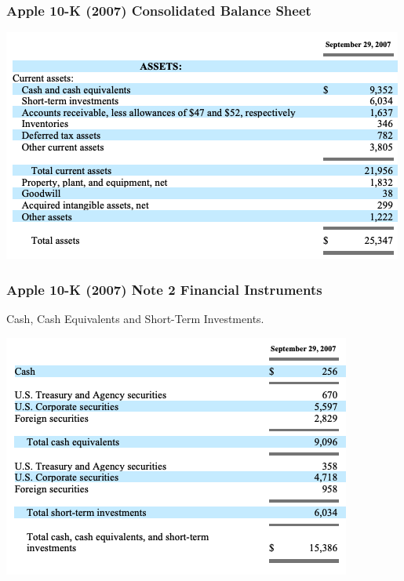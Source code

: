 \documentclass[handout]{beamer}
\begin{document}
\begin{frame}[label=APPL2007]
\frametitle{Apple 10-K (2007) Consolidated Balance Sheet}

\centering
\includegraphics[scale=0.5]{AAPL_2007_bs}
\end{frame}







\begin{frame}
\frametitle{Apple 10-K (2007) Note 2 Financial Instruments}
 Cash, Cash Equivalents and Short-Term Investments.

\centering
\includegraphics[scale=0.5]{AAPL_2007_note2}

\hyperlink{standardapproach}{}
\end{frame}
\end{document}
